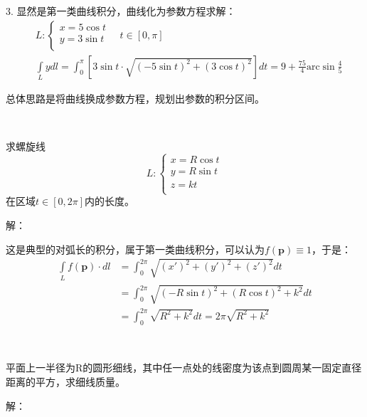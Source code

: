 3. 显然是第一类曲线积分，曲线化为参数方程求解：
\begin{align*}
&L:\begin{cases}
	x=5\cos t\\
	y=3\sin t\\
\end{cases} \quad t\in \left[ 0,\pi \right] \\
&\int\limits_L{ydl}=\int_0^{\pi}{\left[ 3\sin t\cdot \sqrt{\left( -5\sin t \right) ^2+\left( 3\cos t \right) ^2} \right] dt}=9+\frac{75}{4}\mathrm{arc}\sin \frac{4}{5}
\end{align*}

\begin{tcolorbox}
总体思路是将曲线换成参数方程，规划出参数的积分区间。
\end{tcolorbox}

~

\begin{exercise}
求螺旋线
\[
L:\begin{cases}
	x=R\cos t\\
	y=R\sin t\\
	z=kt\\
\end{cases}
\]
在区域$t\in \left[ 0,2\pi \right] $内的长度。
\end{exercise}

解：

这是典型的对弧长的积分，属于第一类曲线积分，可以认为$f\left( \boldsymbol{p} \right) \equiv 1$，于是：
\begin{align*}
\int\limits_L{f\left( \boldsymbol{p} \right) \cdot dl}&=\int_0^{2\pi}{\sqrt{\left( x' \right) ^2+\left( y' \right) ^2+\left( z' \right) ^2}dt} \\
&=\int_0^{2\pi}{\sqrt{\left( -R\sin t \right) ^2+\left( R\cos t \right) ^2+k^2}dt} \\
&=\int_0^{2\pi}{\sqrt{R^2+k^2}dt}=2\pi \sqrt{R^2+k^2}
\end{align*}

~

\begin{exercise}
平面上一半径为R的圆形细线，其中任一点处的线密度为该点到圆周某一固定直径距离的平方，求细线质量。
\end{exercise}

解：

